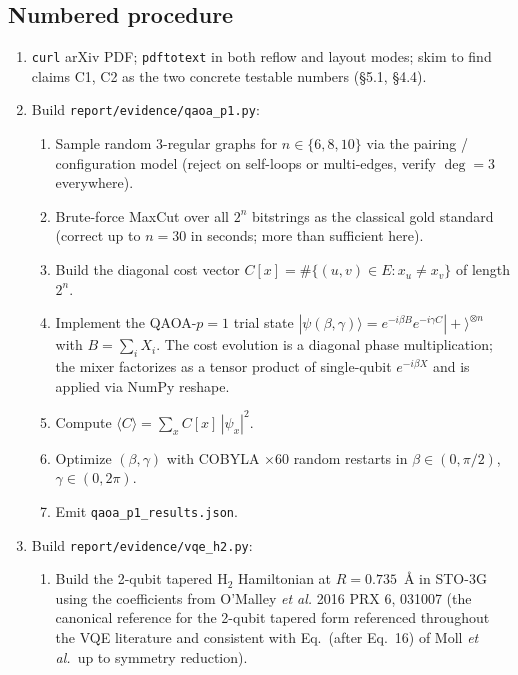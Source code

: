 \documentclass[11pt]{article}
\begin{document}
\subsection{Numbered procedure}
\begin{enumerate}
  \item \texttt{curl} arXiv PDF; \texttt{pdftotext} in both reflow and layout modes; skim to find claims C1, C2 as the two concrete testable numbers (\S 5.1, \S 4.4).
  \item Build \texttt{report/evidence/qaoa\_p1.py}:
    \begin{enumerate}
      \item Sample random 3-regular graphs for $n \in \{6,8,10\}$ via the
            pairing / configuration model (reject on self-loops or multi-edges,
            verify $\deg = 3$ everywhere).
      \item Brute-force MaxCut over all $2^n$ bitstrings as the classical
            gold standard (correct up to $n = 30$ in seconds; more than
            sufficient here).
      \item Build the diagonal cost vector $C[x] = \#\{(u,v)\in E : x_u \neq x_v\}$
            of length $2^n$.
      \item Implement the QAOA-$p{=}1$ trial state
            $|\psi(\beta,\gamma)\rangle = e^{-i\beta B} e^{-i\gamma C} |+\rangle^{\otimes n}$
            with $B = \sum_i X_i$. The cost evolution is a diagonal phase
            multiplication; the mixer factorizes as a tensor product of
            single-qubit $e^{-i\beta X}$ and is applied via NumPy reshape.
      \item Compute $\langle C \rangle = \sum_x C[x]\,|\psi_x|^2$.
      \item Optimize $(\beta,\gamma)$ with COBYLA $\times 60$ random restarts
            in $\beta \in (0, \pi/2)$, $\gamma \in (0, 2\pi)$.
      \item Emit \texttt{qaoa\_p1\_results.json}.
    \end{enumerate}
  \item Build \texttt{report/evidence/vqe\_h2.py}:
    \begin{enumerate}
      \item Build the 2-qubit tapered $\mathrm{H_2}$ Hamiltonian at
            $R = 0.735$~\AA{} in STO-3G using the coefficients from
            O'Malley \emph{et al.} 2016 PRX 6, 031007
            (the canonical reference for the 2-qubit tapered form referenced
            throughout the VQE literature and consistent with Eq.~(after
            Eq.~16) of Moll \emph{et al.}\ up to symmetry reduction).

\end{enumerate}
\end{enumerate}
\end{document}
